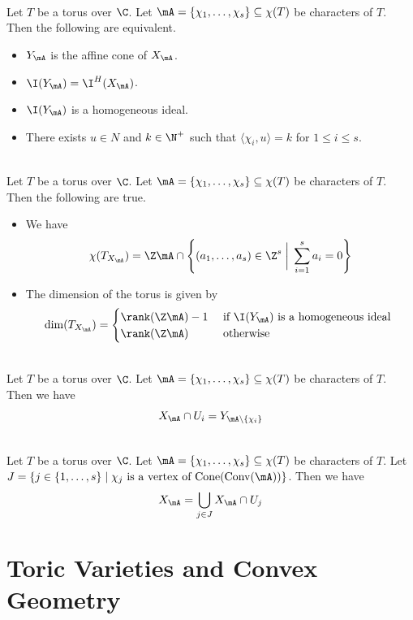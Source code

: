 \documentclass[a4paper]{article}
\begin{document}
\begin{prp}{}{}\\
Let $T$ be a torus over $\C$. Let $\mA=\{\chi_1,\dots,\chi_s\}\subseteq\chi(T)$ be characters of $T$. Then the following are equivalent. 
\begin{itemize}
\item $Y_\mA$ is the affine cone of $X_\mA$. 
\item $\I(Y_\mA)=\I^H(X_\mA)$. 
\item $\I(Y_\mA)$ is a homogeneous ideal. 
\item There exists $u\in N$ and $k\in\N^+$ such that $\langle\chi_i,u\rangle=k$ for $1\leq i\leq s$. 
\end{itemize}
\end{prp}

\begin{prp}{}{}\\
Let $T$ be a torus over $\C$. Let $\mA=\{\chi_1,\dots,\chi_s\}\subseteq\chi(T)$ be characters of $T$. Then the following are true. 
\begin{itemize}
\item We have $$\chi(T_{X_\mA})=\Z\mA\cap\left\{(a_1,\dots,a_s)\in\Z^s\;\bigg{|}\;\sum_{i=1}^sa_i=0\right\}$$
\item The dimension of the torus is given by $$\dim(T_{X_\mA})=\begin{cases}
\rank(\Z\mA)-1 & \text{ if }\I(Y_\mA)\text{ is a homogeneous ideal }\\
\rank(\Z\mA) & \text{ otherwise }
\end{cases}$$
\end{itemize}
\end{prp}

\begin{prp}{}{}\\
Let $T$ be a torus over $\C$. Let $\mA=\{\chi_1,\dots,\chi_s\}\subseteq\chi(T)$ be characters of $T$. Then we have $$X_\mA\cap U_i=Y_{\mA\setminus\{\chi_i\}}$$
\end{prp}

\begin{prp}{}{}\\
Let $T$ be a torus over $\C$. Let $\mA=\{\chi_1,\dots,\chi_s\}\subseteq\chi(T)$ be characters of $T$. Let $J=\{j\in\{1,\dots,s\}\;|\;\chi_j\text{ is a vertex of }\text{Cone}(\text{Conv}(\mA))\}$. Then we have $$X_\mA=\bigcup_{j\in J}X_\mA\cap U_j$$
\end{prp}

\pagebreak
\section{Toric Varieties and Convex Geometry}
\end{document}
